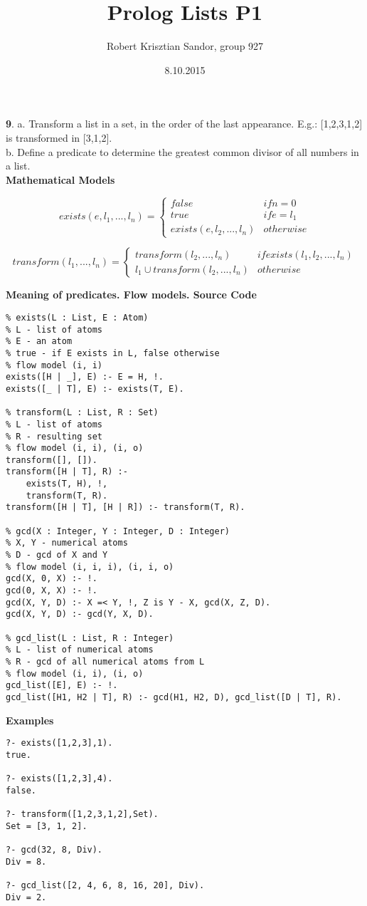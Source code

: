 \documentclass[11pt]{article}
\title{\textbf{Prolog Lists P1}}
\author{Robert Krisztian Sandor, group 927}
\date{8.10.2015}
\begin{document}
\maketitle

\textbf{9}. a. Transform a list in a set, in the order of the last appearance. E.g.: [1,2,3,1,2] is transformed in [3,1,2]. \\

b. Define a predicate to determine the greatest common divisor of all numbers in a list. \\

\textbf{Mathematical Models}

\[
exists(e, l_1, ..., l_n) = 
\left \{
	\begin{array}{ll}
		false & if n = 0 \\
		true & if e = l_1 \\
		exists(e, l_2, ..., l_n) & otherwise
	\end{array}
\right.
\]

\[
transform(l_1, ..., l_n) = 
\left \{
	\begin{array}{ll}
		transform(l_2, ..., l_n) & if exists(l_1, l_2, ..., l_n) \\
		l_1 \cup transform(l_2, ..., l_n) & otherwise
	\end{array}
\right.
\]

\textbf{Meaning of predicates. Flow models. Source Code}

\begin{verbatim}
% exists(L : List, E : Atom)
% L - list of atoms
% E - an atom
% true - if E exists in L, false otherwise
% flow model (i, i)
exists([H | _], E) :- E = H, !.
exists([_ | T], E) :- exists(T, E).

% transform(L : List, R : Set)
% L - list of atoms
% R - resulting set
% flow model (i, i), (i, o)
transform([], []).
transform([H | T], R) :-
    exists(T, H), !,
    transform(T, R).
transform([H | T], [H | R]) :- transform(T, R).

% gcd(X : Integer, Y : Integer, D : Integer)
% X, Y - numerical atoms
% D - gcd of X and Y
% flow model (i, i, i), (i, i, o)
gcd(X, 0, X) :- !.
gcd(0, X, X) :- !.
gcd(X, Y, D) :- X =< Y, !, Z is Y - X, gcd(X, Z, D).
gcd(X, Y, D) :- gcd(Y, X, D).

% gcd_list(L : List, R : Integer)
% L - list of numerical atoms
% R - gcd of all numerical atoms from L
% flow model (i, i), (i, o)
gcd_list([E], E) :- !.
gcd_list([H1, H2 | T], R) :- gcd(H1, H2, D), gcd_list([D | T], R).
\end{verbatim}

\textbf{Examples}
\begin{verbatim}
?- exists([1,2,3],1).
true.

?- exists([1,2,3],4).
false.

?- transform([1,2,3,1,2],Set).
Set = [3, 1, 2].

?- gcd(32, 8, Div).
Div = 8.

?- gcd_list([2, 4, 6, 8, 16, 20], Div).
Div = 2.

\end{verbatim}
\end{document}
